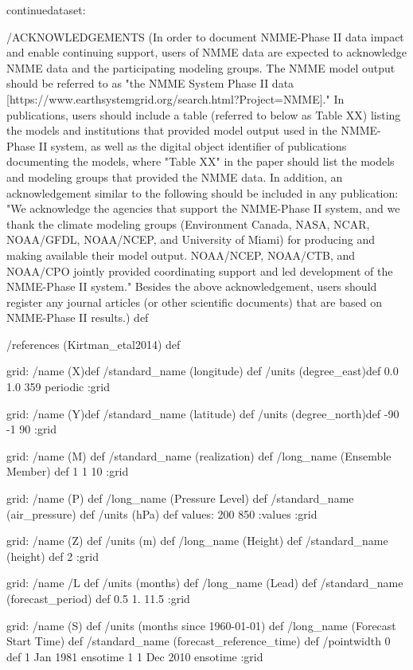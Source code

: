 \begin{ingrid}
continuedataset:

/ACKNOWLEDGEMENTS (In order to document NMME-Phase II data impact and enable continuing support, users of NMME data are expected to acknowledge NMME data and the participating modeling groups. The NMME model output should be referred to as "the NMME System Phase II data [https://www.earthsystemgrid.org/search.html?Project=NMME]."  In publications, users should include a table (referred to below as Table XX) listing the models and institutions that provided model output used in the NMME-Phase II system, as well as the digital object identifier of publications documenting the models, where "Table XX" in the paper should list the models and modeling groups that provided the NMME data.  In addition, an acknowledgement similar to the following should be included in any publication:  "We acknowledge the agencies that support the NMME-Phase II system, and we thank the climate modeling groups (Environment Canada, NASA, NCAR, NOAA/GFDL, NOAA/NCEP, and University of Miami) for producing and making available their model output. NOAA/NCEP, NOAA/CTB, and NOAA/CPO jointly provided coordinating support and led development of the NMME-Phase II system."  Besides the above acknowledgement, users should register any journal articles (or other scientific documents) that are based on NMME-Phase II results.) def

/references (Kirtman_etal2014) def

grid:
/name (X)def
/standard_name (longitude) def
/units (degree_east)def
 0.0 1.0 359
 periodic
:grid

grid:
/name (Y)def
/standard_name (latitude) def
/units (degree_north)def
-90 -1 90
:grid

grid:
/name (M) def
/standard_name (realization) def
/long_name (Ensemble Member) def
1 1 10
:grid

grid:
/name (P) def
/long_name (Pressure Level) def
/standard_name (air_pressure) def
/units (hPa) def
values: 200 850 :values
:grid

grid:
/name (Z) def
/units (m) def
/long_name (Height) def
/standard_name (height) def
2
:grid

grid:
/name /L def
/units (months) def
/long_name (Lead) def
/standard_name (forecast_period) def
0.5 1. 11.5
:grid

grid:
/name (S) def
/units (months since 1960-01-01) def
/long_name (Forecast Start Time) def
/standard_name (forecast_reference_time) def
/pointwidth 0 def
1 Jan 1981 ensotime
1
1 Dec 2010 ensotime
:grid


\end{ingrid}
